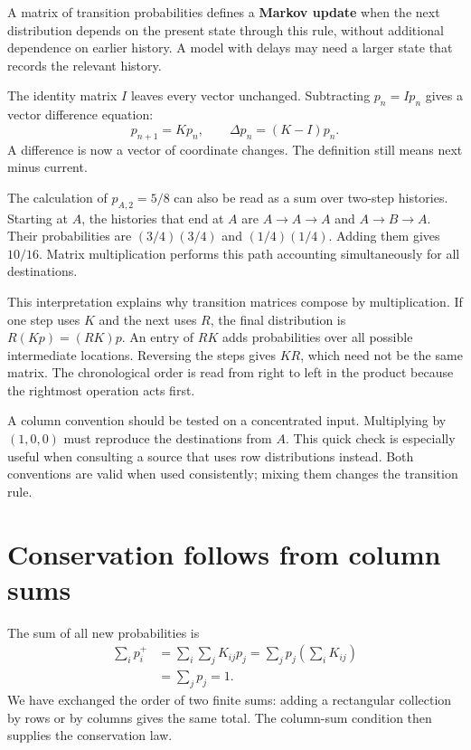 \documentclass[11pt,oneside,openany]{book}
\theoremstyle{definition}
\theoremstyle{remark}
\numberwithin{equation}{chapter}
\begin{document}
A matrix of transition probabilities defines a \textbf{Markov update} when the next distribution depends on the present state through this rule, without additional dependence on earlier history. A model with delays may need a larger state that records the relevant history.

The identity matrix \(I\) leaves every vector unchanged. Subtracting \(p_n=Ip_n\) gives a vector difference equation: \[\boxed{p_{n+1}=Kp_n,\qquad \Delta p_n=(K-I)p_n.}\] A difference is now a vector of coordinate changes. The definition still means next minus current.

The calculation of \(p_{A,2}=5/8\) can also be read as a sum over two-step histories. Starting at \(A\), the histories that end at \(A\) are \(A\to A\to A\) and \(A\to B\to A\). Their probabilities are \((3/4)(3/4)\) and \((1/4)(1/4)\). Adding them gives \(10/16\). Matrix multiplication performs this path accounting simultaneously for all destinations.

This interpretation explains why transition matrices compose by multiplication. If one step uses \(K\) and the next uses \(R\), the final distribution is \(R(Kp)=(RK)p\). An entry of \(RK\) adds probabilities over all possible intermediate locations. Reversing the steps gives \(KR\), which need not be the same matrix. The chronological order is read from right to left in the product because the rightmost operation acts first.

A column convention should be tested on a concentrated input. Multiplying by \((1,0,0)\) must reproduce the destinations from \(A\). This quick check is especially useful when consulting a source that uses row distributions instead. Both conventions are valid when used consistently; mixing them changes the transition rule.

\section{Conservation follows from column sums}\label{ch04-conservation-follows-from-column-sums}

The sum of all new probabilities is \[\begin{aligned}
\sum_i p_i^+
&=\sum_i\sum_j K_{ij}p_j
=\sum_j p_j\left(\sum_i K_{ij}\right)\\
&=\sum_j p_j=1.
\end{aligned}\] We have exchanged the order of two finite sums: adding a rectangular collection by rows or by columns gives the same total. The column-sum condition then supplies the conservation law.
\end{document}
